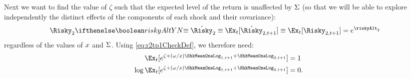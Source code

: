 Next we want to find the value of $\zeta$ such that the expected level of the return is unaffected by $\Sigma$ (so
that we will be able to explore independently the distinct effects of the
components of each shock and their covariance):
\begin{equation}\begin{gathered}\begin{aligned}
  \Risky_{2} \ifriskyAlt{\equiv \acute{\Risky}_{2} \equiv \Ex_{t}[\acute{\Risky}_{2,t+1}]}{}\equiv  \Ex_{t}[\Risky_{2,t+1}] & =  e^{\riskyAlt_{2}}
\end{aligned}\end{gathered}\end{equation}
regardless of the values of $x$ and $\Sigma$.  Using \eqref{eq:r2tp1CheckDef}, we therefore need:
\begin{equation}\begin{gathered}\begin{aligned}
         \Ex_{t}[e^{\zeta+ (\omega/\scale)\ShkMeanOneLog_{1,t+1}  + \ShkMeanOneLog_{2,t+1}}] & =  1
\\ \log  \Ex_{t}[e^{\zeta+ (\omega/\scale)\ShkMeanOneLog_{1,t+1}  + \ShkMeanOneLog_{2,t+1}}] & =  0.
\end{aligned}\end{gathered}\end{equation}

